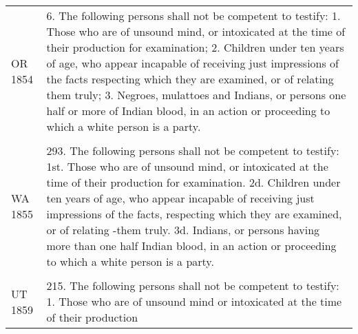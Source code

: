\documentclass[12pt,]{article}
\begin{document}
\begin{longtable}[]{@{}ll@{}}
\begin{minipage}[t]{0.17\columnwidth}\raggedright
OR 1854\strut
\end{minipage} & \begin{minipage}[t]{0.77\columnwidth}\raggedright
6. The following persons shall not be competent to testify: 1. Those who
are of unsound mind, or intoxicated at the time of their production for
examination; 2. Children under ten years of age, who appear incapable of
receiving just impressions of the facts respecting which they are
examined, or of relating them truly; 3. Negroes, mulattoes and Indians,
or persons one half or more of Indian blood, in an action or proceeding
to which a white person is a party.\strut
\end{minipage}\tabularnewline
\begin{minipage}[t]{0.17\columnwidth}\raggedright
\strut
\end{minipage} & \begin{minipage}[t]{0.77\columnwidth}\raggedright
\strut
\end{minipage}\tabularnewline
\begin{minipage}[t]{0.17\columnwidth}\raggedright
WA 1855\strut
\end{minipage} & \begin{minipage}[t]{0.77\columnwidth}\raggedright
293. The following persons shall not be competent to testify: 1st. Those
who are of unsound mind, or intoxicated at the time of their production
for examination. 2d. Children under ten years of age, who appear
incapable of receiving just impressions of the facts, respecting which
they are examined, or of relating -them truly. 3d. Indians, or persons
having more than one half Indian blood, in an action or proceeding to
which a white person is a party.\strut
\end{minipage}\tabularnewline
\begin{minipage}[t]{0.17\columnwidth}\raggedright
\strut
\end{minipage} & \begin{minipage}[t]{0.77\columnwidth}\raggedright
\strut
\end{minipage}\tabularnewline
\begin{minipage}[t]{0.17\columnwidth}\raggedright
UT 1859\strut
\end{minipage} & \begin{minipage}[t]{0.77\columnwidth}\raggedright
215. The following persons shall not be competent to testify: 1. Those
who are of unsound mind or intoxicated at the time of their production

\end{minipage}
\end{longtable}
\end{document}
